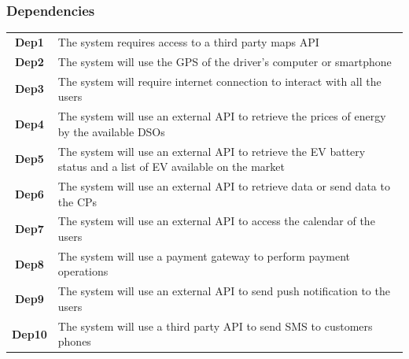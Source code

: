 \subsubsection{Dependencies}
\begin{table}[H]
      \begin{tabularx}{\textwidth}{cX}
            \toprule
            \textbf{Dep1}  & The system requires access to a third party maps API                                                           \\
            \textbf{Dep2}  & The system will use the GPS of the driver's computer or smartphone                                             \\
            \textbf{Dep3}  & The system will require internet connection to interact with all the users                                     \\
            \textbf{Dep4}  & The system will use an external API to retrieve the prices of energy by the available DSOs                     \\
            \textbf{Dep5}  & The system will use an external API to retrieve the EV battery status and a list of EV available on the market \\
            \textbf{Dep6}  & The system will use an external API to retrieve data or send data to the CPs                                   \\
            \textbf{Dep7}  & The system will use an external API to access the calendar of the users                                        \\
            \textbf{Dep8}  & The system will use a payment gateway to perform payment operations                                            \\
            \textbf{Dep9}  & The system will use an external API to send push notification to the users                                   \\
            \textbf{Dep10} & The system will use a third party API to send SMS to customers phones                                          \\
            \bottomrule
      \end{tabularx}
\end{table}
